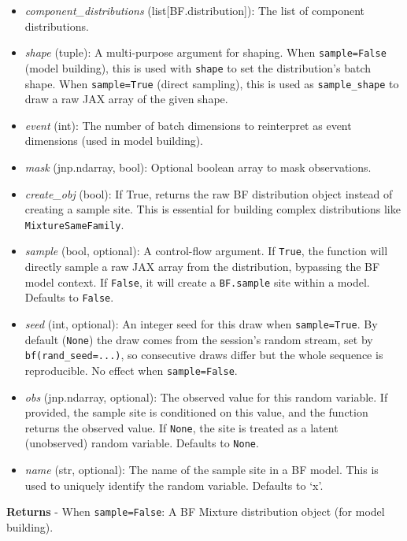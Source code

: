 \documentclass[
  letterpaper,
  DIV=11,
  numbers=noendperiod]{scrartcl}
\begin{document}
\begin{itemize}
\item
  \emph{component\_distributions} (list{[}BF.distribution{]}): The list
  of component distributions.
\item
  \emph{shape} (tuple): A multi-purpose argument for shaping. When
  \texttt{sample=False} (model building), this is used with
  \texttt{shape} to set the distribution's batch shape. When
  \texttt{sample=True} (direct sampling), this is used as
  \texttt{sample\_shape} to draw a raw JAX array of the given shape.
\item
  \emph{event} (int): The number of batch dimensions to reinterpret as
  event dimensions (used in model building).
\item
  \emph{mask} (jnp.ndarray, bool): Optional boolean array to mask
  observations.
\item
  \emph{create\_obj} (bool): If True, returns the raw BF distribution
  object instead of creating a sample site. This is essential for
  building complex distributions like \texttt{MixtureSameFamily}.
\item
  \emph{sample} (bool, optional): A control-flow argument. If
  \texttt{True}, the function will directly sample a raw JAX array from
  the distribution, bypassing the BF model context. If \texttt{False},
  it will create a \texttt{BF.sample} site within a model. Defaults to
  \texttt{False}.
\item
  \emph{seed} (int, optional): An integer seed for this draw when
  \texttt{sample=True}. By default (\texttt{None}) the draw comes from
  the session's random stream, set by \texttt{bf(rand\_seed=...)}, so
  consecutive draws differ but the whole sequence is reproducible. No
  effect when \texttt{sample=False}.
\item
  \emph{obs} (jnp.ndarray, optional): The observed value for this random
  variable. If provided, the sample site is conditioned on this value,
  and the function returns the observed value. If \texttt{None}, the
  site is treated as a latent (unobserved) random variable. Defaults to
  \texttt{None}.
\item
  \emph{name} (str, optional): The name of the sample site in a BF
  model. This is used to uniquely identify the random variable. Defaults
  to `x'.
\end{itemize}

\textbf{Returns} - When \texttt{sample=False}: A BF Mixture distribution
object (for model building).
\end{document}

